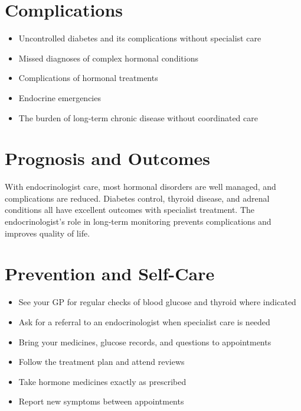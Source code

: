 \section*{Complications}
\begin{itemize}
    \item Uncontrolled diabetes and its complications without specialist care
    \item Missed diagnoses of complex hormonal conditions
    \item Complications of hormonal treatments
    \item Endocrine emergencies
    \item The burden of long-term chronic disease without coordinated care
\end{itemize}

\section*{Prognosis and Outcomes}
With endocrinologist care, most hormonal disorders are well managed, and complications are reduced. Diabetes control, thyroid disease, and adrenal conditions all have excellent outcomes with specialist treatment. The endocrinologist's role in long-term monitoring prevents complications and improves quality of life.

\section*{Prevention and Self-Care}
\begin{itemize}
    \item See your GP for regular checks of blood glucose and thyroid where indicated
    \item Ask for a referral to an endocrinologist when specialist care is needed
    \item Bring your medicines, glucose records, and questions to appointments
    \item Follow the treatment plan and attend reviews
    \item Take hormone medicines exactly as prescribed
    \item Report new symptoms between appointments
\end{itemize}

